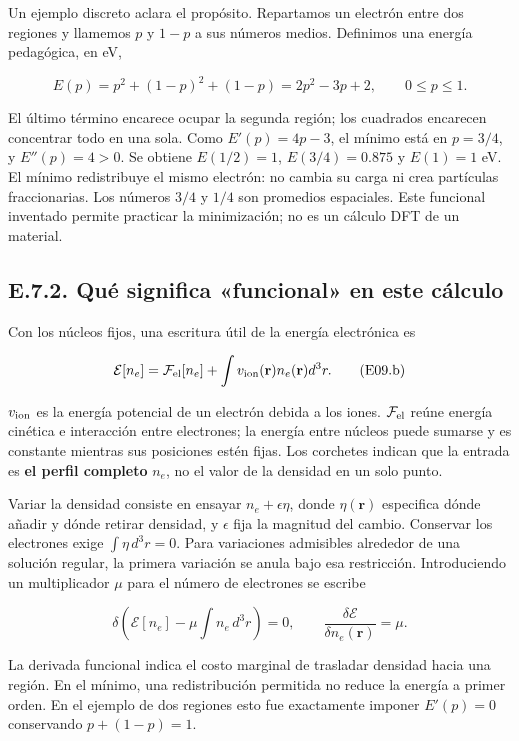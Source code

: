 \documentclass[
  spanish,
  10pt,
  a4paper,
]{article}
\begin{document}
Un ejemplo discreto aclara el propósito. Repartamos un electrón entre
dos regiones y llamemos \(p\) y \(1-p\) a sus números medios. Definimos
una energía pedagógica, en eV,

\[
E(p)=p^2+(1-p)^2+(1-p)=2p^2-3p+2,
\qquad 0\le p\le1.
\tag{E09.a}
\]

El último término encarece ocupar la segunda región; los cuadrados
encarecen concentrar todo en una sola. Como \(E'(p)=4p-3\), el mínimo
está en \(p=3/4\), y \(E''(p)=4>0\). Se obtiene \(E(1/2)=1\),
\(E(3/4)=0.875\) y \(E(1)=1\) eV. El mínimo redistribuye el mismo
electrón: no cambia su carga ni crea partículas fraccionarias. Los
números \(3/4\) y \(1/4\) son promedios espaciales. Este funcional
inventado permite practicar la minimización; no es un cálculo DFT de un
material.

\subsection{E.7.2. Qué significa «funcional» en este
cálculo}\label{e.7.2.-quuxe9-significa-funcional-en-este-cuxe1lculo}

Con los núcleos fijos, una escritura útil de la energía electrónica es

\[
\mathcal E[n_e]=\mathcal F_{\rm el}[n_e]
+\int v_{\rm ion}(\mathbf r)n_e(\mathbf r)d^3r.
\tag{E09.b}
\]

\(v_{\rm ion}\) es la energía potencial de un electrón debida a los
iones. \(\mathcal F_{\rm el}\) reúne energía cinética e interacción
entre electrones; la energía entre núcleos puede sumarse y es constante
mientras sus posiciones estén fijas. Los corchetes indican que la
entrada es \textbf{el perfil completo} \(n_e\), no el valor de la
densidad en un solo punto.

Variar la densidad consiste en ensayar \(n_e+\epsilon\eta\), donde
\(\eta(\mathbf r)\) especifica dónde añadir y dónde retirar densidad, y
\(\epsilon\) fija la magnitud del cambio. Conservar los electrones exige
\(\int\eta\,d^3r=0\). Para variaciones admisibles alrededor de una
solución regular, la primera variación se anula bajo esa restricción.
Introduciendo un multiplicador \(\mu\) para el número de electrones se
escribe

\[
\delta\left(\mathcal E[n_e]-\mu\int n_e\,d^3r\right)=0,
\qquad \frac{\delta\mathcal E}{\delta n_e(\mathbf r)}=\mu.
\tag{E09.c}
\]

La derivada funcional indica el costo marginal de trasladar densidad
hacia una región. En el mínimo, una redistribución permitida no reduce
la energía a primer orden. En el ejemplo de dos regiones esto fue
exactamente imponer \(E'(p)=0\) conservando \(p+(1-p)=1\).
\end{document}
